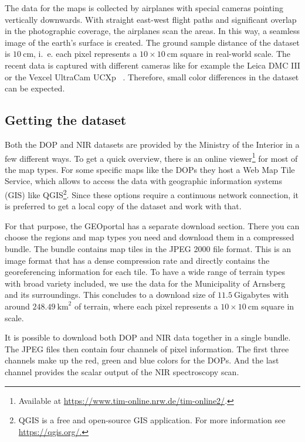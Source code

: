 The data for the maps is collected by airplanes with special cameras pointing vertically downwards. With straight east-west flight paths and significant overlap in the photographic coverage, the airplanes scan the areas. In this way, a seamless image of the earth's surface is created. The ground sample distance of the dataset is $10~\text{cm}$, i.~e. each pixel represents a $10\times 10~\text{cm}$ square in real-world scale. The recent data is captured with different cameras like for example the Leica DMC III or the Vexcel UltraCam UCXp ~\cite{topo-image16}. Therefore, small color differences in the dataset can be expected.

\subsection{Getting the dataset}
Both the DOP and NIR datasets are provided by the Ministry of the Interior in a few different ways. To get a quick overview, there is an online viewer\footnote{Available at \url{https://www.tim-online.nrw.de/tim-online2/}.} for most of the map types. For some specific maps like the DOPs they host a Web Map Tile Service, which allows to access the data with geographic information systems (GIS) like QGIS\footnote{QGIS is a free and open-source GIS application. For more information see \url{https://qgis.org/.}}. Since these options require a continuous network connection, it is preferred to get a local copy of the dataset and work with that.

For that purpose, the GEOportal has a separate download section. There you can choose the regions and map types you need and download them in a compressed bundle. The bundle contains map tiles in the JPEG 2000 file format. This is an image format that has a dense compression rate and directly contains the georeferencing information for each tile. To have a wide range of terrain types with broad variety included, we use the data for the Municipality of Arnsberg and its surroundings. This concludes to a download size of $11.5~\text{Gigabytes}$ with around $248.49~\text{km}^2$ of terrain, where each pixel represents a $10\times 10~\text{cm}$ square in scale.

It is possible to download both DOP and NIR data together in a single bundle. The JPEG files then contain four channels of pixel information. The first three channels make up the red, green and blue colors for the DOPs. And the last channel provides the scalar output of the NIR spectroscopy scan.

